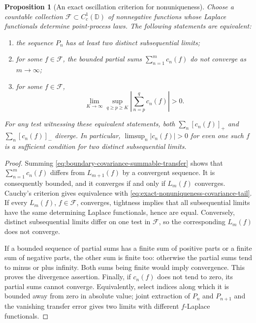\documentclass[11pt,a4paper]{article}
\numberwithin{equation}{section}
\newtheorem{proposition}[theorem]{Proposition}
\theoremstyle{definition}
\theoremstyle{remark}
\newcommand{\D}{\mathbb D}
\begin{document}
\begin{proposition}[An exact oscillation criterion for nonuniqueness]
\label{prop:boundary-covariance-nonuniqueness}
Choose a countable collection $\mathcal F\subset C_c^1(\D)$ of
nonnegative functions whose Laplace functionals determine point-process
laws.  The following statements are equivalent:
\begin{enumerate}
\item the sequence $P_n$ has at least two distinct subsequential limits;
\item for some $f\in\mathcal F$, the bounded partial sums
      $\sum_{n=1}^{m}c_n(f)$ do not converge as $m\to\infty$;
\item for some $f\in\mathcal F$,
\begin{equation}
 \lim_{K\to\infty}\sup_{q\geq p\geq K}
           \left|\sum_{n=p}^{q}c_n(f)\right|>0.
 \label{eq:exact-nonuniqueness-covariance-tail}
\end{equation}
\end{enumerate}
For any test witnessing these equivalent statements, both
$\sum_n[c_n(f)]_+$ and $\sum_n[c_n(f)]_-$ diverge.
In particular, $\limsup_n|c_n(f)|>0$ for even one such $f$ is a
sufficient condition for two distinct subsequential limits.
\end{proposition}

\begin{proof}
Summing \eqref{eq:boundary-covariance-summable-transfer} shows that
$\sum_{n=1}^{m}c_n(f)$ differs from $L_{m+1}(f)$ by a convergent
sequence.  It is consequently bounded, and it converges if and only
if $L_m(f)$ converges.  Cauchy's criterion gives equivalence with
\eqref{eq:exact-nonuniqueness-covariance-tail}.  If every $L_m(f)$,
$f\in\mathcal F$, converges, tightness implies that all subsequential
limits have the same determining Laplace functionals, hence are equal.
Conversely, distinct subsequential limits differ on one test in
$\mathcal F$, so the corresponding $L_m(f)$ does not converge.

If a bounded sequence of partial sums has a finite sum of positive
parts or a finite sum of negative parts, the other sum is finite too:
otherwise the partial sums tend to minus or plus infinity.  Both sums
being finite would imply convergence.  This proves the divergence
assertion.  Finally, if $c_n(f)$ does not tend to zero, its partial
sums cannot converge.  Equivalently, select indices along which it
is bounded away from zero in absolute value; joint extraction of
$P_n$ and $P_{n+1}$ and the vanishing transfer error gives two
limits with different $f$-Laplace functionals.
\end{proof}
\end{document}
